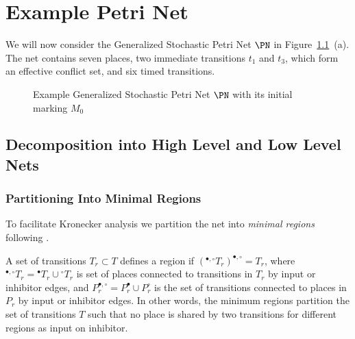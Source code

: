 \chapter{Example Petri Net}

We will now consider the Generalized Stochastic Petri Net $\PN$ in
Figure~\ref{fig:example:pn}~(a). The net contains seven places, two
immediate transitions $t_1$ and $t_3$, which form an effective
conflict set, and six timed transitions.

\begin{figure}
  \hspace*{\fill}
  \parbox[c]{0.55\linewidth}{\centering }
  \hfill
  \parbox[c]{0.4\linewidth}{\centering }
  \hspace*{\fill}
  \par\vspace{0.5\onelineskip}
  \hspace*{\fill}
  \parbox[t]{0.55\linewidth}{}
  \hfill
  \parbox[t]{0.4\linewidth}{}
  \hspace*{\fill}
  \caption{Example Generalized Stochastic Petri Net $\PN$ with its
    initial marking $M_0$}
  \label{fig:example:pn}
\end{figure}

\section{Decomposition into High Level and Low Level Nets}

\subsection{Partitioning Into Minimal Regions}

To facilitate Kronecker analysis we partition the net into
\emph{minimal regions} following
\citet{DBLP:journals/sigmetrics/BuchholzK98}.

A set of transitions $T_r \subset T$ defines a region if
$({}^{\bullet, \circ}T_r)^{\bullet, \circ} = T_r$, where
${}^{\bullet,\circ}T_r = {}^{\bullet}T_r \cup {}^{\circ}T_r$ is set of
places connected to transitions in $T_r$ by input or inhibitor edges,
and $P_r^{\bullet, \circ} = P_r^{\bullet} \cup P_r^{\circ}$ is the set
of transitions connected to places in $P_r$ by input or inhibitor
edges. In other words, the minimum regions partition the set of
transitions $T$ such that no place is shared by two transitions for
different regions as input on inhibitor.


